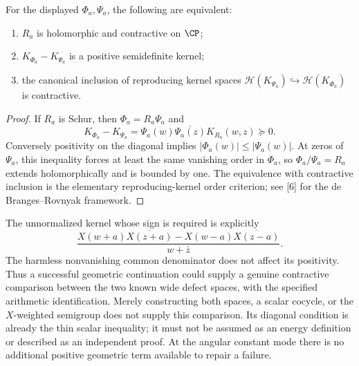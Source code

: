 \begin{proposition}\label{prop:comparison}
For the displayed $\Phi_a,\Psi_a$, the following are equivalent:
\begin{enumerate}
\item $R_a$ is holomorphic and contractive on $\CP$;
\item $K_{\Phi_a}-K_{\Psi_a}$ is a positive semidefinite kernel;
\item the canonical inclusion of reproducing kernel spaces
$\mathcal H(K_{\Psi_a})\hookrightarrow\mathcal H(K_{\Phi_a})$ is contractive.
\end{enumerate}
\end{proposition}
\begin{proof}
If $R_a$ is Schur, then $\Phi_a=R_a\Psi_a$ and
\[
 K_{\Phi_a}-K_{\Psi_a}=\Psi_a(w)\overline{\Psi_a(z)}K_{R_a}(w,z)\succeq0.
\]
Conversely positivity on the diagonal implies $|\Phi_a(w)|\leq|\Psi_a(w)|$. At zeros of $\Psi_a$, this inequality forces at least the same vanishing order in $\Phi_a$, so $\Phi_a/\Psi_a=R_a$ extends holomorphically and is bounded by one. The equivalence with contractive inclusion is the elementary reproducing-kernel order criterion; see [6] for the de Branges--Rovnyak framework.
\end{proof}
The unnormalized kernel whose sign is required is explicitly
\[
 \frac{X(w+a)\overline{X(z+a)}-X(w-a)\overline{X(z-a)}}{w+\bar z}.
\]
The harmless nonvanishing common denominator does not affect its positivity. Thus a successful geometric continuation could supply a genuine contractive comparison between the two known wide defect spaces, with the specified arithmetic identification. Merely constructing both spaces, a scalar cocycle, or the $X$-weighted semigroup does not supply this comparison. Its diagonal condition is already the thin scalar inequality; it must not be assumed as an energy definition or described as an independent proof. At the angular constant mode there is no additional positive geometric term available to repair a failure.
